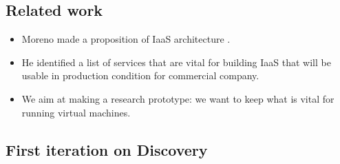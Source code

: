 \subsection{Related work}

\begin{itemize}

	\item Moreno made a proposition of IaaS architecture \cite{moreno2012iaas}.	
	
	\item He identified a list of services that are vital for building IaaS that will be usable in production condition for commercial company.

	\item We aim at making a research prototype: we want to keep what is vital for running virtual machines.

\end{itemize}

\subsection{First iteration on Discovery}

